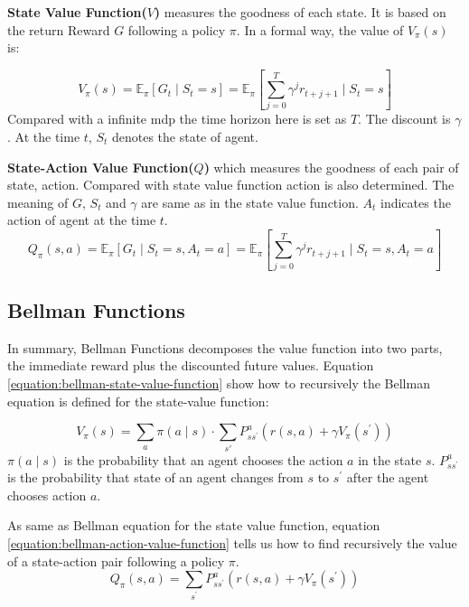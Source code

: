 \textbf{State Value Function($V$)} measures the goodness of each state. It is based on the return Reward $G$ following a policy $\pi$. In a formal way, the value of $V_\pi(s)$ is:

\begin{equation} 
V_{\pi}(s)=\mathbb{E}_{\pi}\left[G_{t} \mid S_{t}=s \right]=\mathbb{E}_{\pi}\left[\sum_{j=0}^{T} \gamma^{j} r_{t+j+1} \mid S_{t}=s\right]
\end{equation}
Compared with a infinite \gls{mdp} the time horizon here is set as $T$. The discount is $\gamma$. At the time $t$, $S_t$ denotes the state of agent.

\textbf{State-Action Value Function($Q$)} which measures the goodness of each pair of state, action. Compared with state value function action is also determined. The meaning of $G$, $S_t$ and $\gamma$ are same as in the state value function. $A_t$ indicates the action of agent at the time $t$.
\begin{equation}
Q_{\pi}(s, a)=\mathbb{E}_{\pi}\left[G_{t} \mid S_{t}=s, A_{t}=a\right]=\mathbb{E}_{\pi}\left[\sum_{j=0}^{T} \gamma^{j} r_{t+j+1} \mid S_{t}=s, A_{t}=a\right]
\end{equation}

\subsection{Bellman Functions}
In summary, Bellman Functions decomposes the value function into two parts, the immediate reward plus the discounted future values. Equation \ref{equation:bellman-state-value-function} show how to recursively the Bellman equation is defined for the state-value function:

\begin{equation} \label{equation:bellman-state-value-function}
V_{\pi}(s)=\sum_{a} \pi(a \mid s) \cdot \sum_{s \prime} P_{s s^{\prime}}^{a}\left(r(s, a)+\gamma V_{\pi}\left(s^{\prime}\right)\right)
\end{equation}
$\pi(a \mid s)$ is the probability that an agent chooses the action $a$ in the state $s$. $P_{s s^{\prime}}^{a}$ is the probability that state of an agent changes from $s$ to $s^{\prime}$ after the agent chooses action $a$.

As same as Bellman equation for the state value function, equation \ref{equation:bellman-action-value-function} tells us how to find recursively the value of a state-action pair following a policy $\pi$.
\begin{equation} \label{equation:bellman-action-value-function}
Q_{\pi}(s, a)=\sum_{s^{\prime}} P_{s s^{\prime}}^{a}\left(r(s, a)+\gamma V_{\pi}\left(s^{\prime}\right)\right)
\end{equation}

